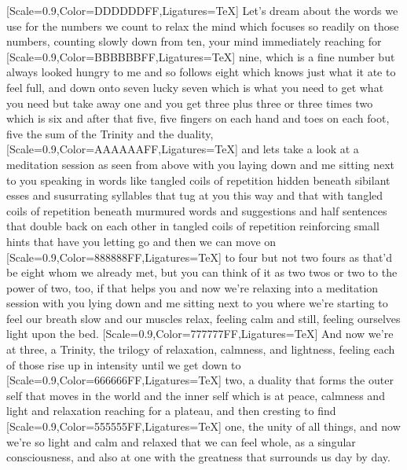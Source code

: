 \label{induction}
{\large{}[Scale=0.9,Color=DDDDDDFF,Ligatures=TeX] Let's dream about the words we use for the numbers we count to relax the mind which focuses so readily on those numbers, counting slowly down from ten, your mind immediately reaching for}
{\normalsize{}[Scale=0.9,Color=BBBBBBFF,Ligatures=TeX] nine, which is a fine number but always looked hungry to me and so follows eight which knows just what it ate to feel full, and down onto seven lucky seven which is what you need to get what you need but take away one and you get three plus three or three times two which is six and after that five, five fingers on each hand and toes on each foot, five the sum of the Trinity and the duality,}
{[Scale=0.9,Color=AAAAAAFF,Ligatures=TeX] and lets take a look at a meditation session as seen from above with you laying down and me sitting next to you
speaking in words like tangled coils of repetition hidden beneath sibilant esses and susurrating syllables that tug at you this way and that with tangled coils of repetition beneath murmured words and suggestions and half sentences that double back on each other in tangled coils of repetition reinforcing small hints that have you letting go and then we can move on}
{\small{}[Scale=0.9,Color=888888FF,Ligatures=TeX] to four but not two fours as that'd be eight whom we already met, but you can think of it as two twos or two to the power of two, too, if that helps you and now we're relaxing into a meditation session with you lying down and me sitting next to you where we're starting to feel our breath slow and our muscles relax, feeling calm and still, feeling ourselves light upon the bed.}
{\footnotesize{}[Scale=0.9,Color=777777FF,Ligatures=TeX] And now we're at three, a Trinity, the trilogy of relaxation, calmness, and lightness, feeling each of those rise up in intensity until we get down to}
{\scriptsize{}[Scale=0.9,Color=666666FF,Ligatures=TeX] two, a duality that forms the outer self that moves in the world and the inner self which is at peace, calmness and light and relaxation reaching for a plateau, and then cresting to find}
{\tiny{}[Scale=0.9,Color=555555FF,Ligatures=TeX] one, the unity of all things, and now we're so light and calm and relaxed that we can feel whole, as a singular consciousness, and also at one with the greatness that surrounds us day by day.}
